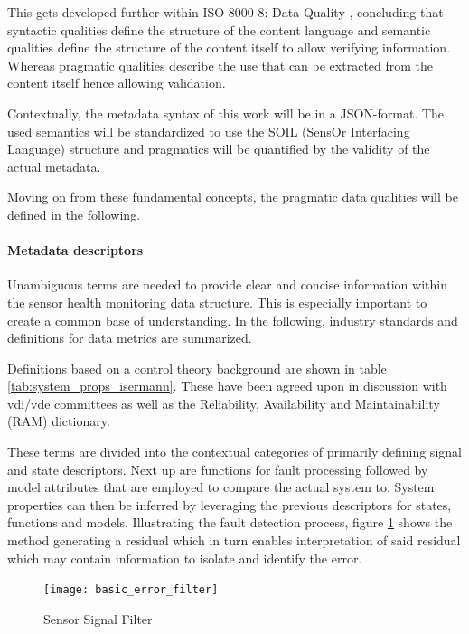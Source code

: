 This gets developed further within ISO 8000-8: Data Quality \cite{iso_data-quality_information_2015}, concluding that syntactic qualities define the structure of the content language and semantic qualities define the structure of the content itself to allow verifying information. Whereas pragmatic qualities describe the use that can be extracted from the content itself hence allowing validation.

Contextually, the metadata syntax of this work will be in a JSON-format. The used semantics will be standardized to use the SOIL (SensOr Interfacing Language) structure and pragmatics will be quantified by the validity of the actual metadata.

Moving on from these fundamental concepts, the pragmatic data qualities will be defined in the following.

\paragraph{Metadata descriptors}

Unambiguous terms are needed to provide clear and concise information within the sensor health monitoring data structure. This is especially important to create a common base of understanding. In the following, industry standards and definitions for data metrics are summarized.

Definitions based on a control theory background are shown in table \ref{tab:system_props_isermann}. These have been agreed upon in discussion with vdi/vde committees as well as the Reliability, Availability and Maintainability (RAM) dictionary. \cite{isermann_trends_nodate,din_din25424_fehlerbaumanalysepdf_1977}

These terms are divided into the contextual categories of primarily defining signal and state descriptors. Next up are functions for fault processing followed by model attributes that are employed to compare the actual system to. System properties can then be inferred by leveraging the previous descriptors for states, functions and models. Illustrating the fault detection process, figure \ref{fig:basic_error_filter} shows the method generating a residual which in turn enables interpretation of said residual which may contain information to isolate and identify the error.


\begin{figure}[ht]
    \centering
    \texttt{[image: basic\_error\_filter]}
    \caption{Sensor Signal Filter}
    \label{fig:basic_error_filter}
\end{figure}






